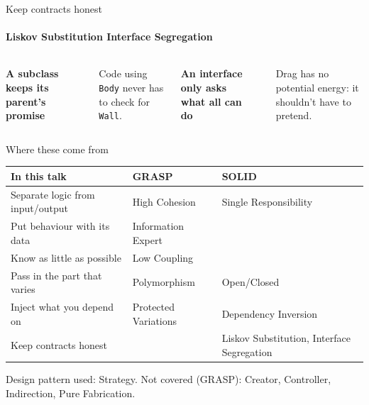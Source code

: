 \begin{frame}[fragile]{Keep contracts honest}
    \framesubtitle{Liskov Substitution \textperiodcentered{} Interface Segregation}

    \begin{columns}[T]
        \textbf{A subclass keeps its parent's promise}
        \inputminted{python}{code/design/contracts_subclass.py}
        \small Code using \texttt{Body} never has to check for \texttt{Wall}.

        \pause
        \textbf{An interface only asks what all can do}
        \inputminted{python}{code/design/contracts_interface.py}
        \small Drag has no potential energy: it shouldn't have to pretend.
    \end{columns}

\end{frame}



\begin{frame}{Where these come from}

    \centering\small
    \begin{tabular}{lll}
        \textbf{In this talk} & \textbf{GRASP} & \textbf{SOLID} \\ \hline
        Separate logic from input/output & High Cohesion & Single Responsibility \\
        Put behaviour with its data & Information Expert & \\
        Know as little as possible & Low Coupling & \\
        Pass in the part that varies & Polymorphism & Open/Closed \\
        Inject what you depend on & Protected Variations & Dependency Inversion \\
        Keep contracts honest & & Liskov Substitution, Interface Segregation \\
    \end{tabular}

    \vfill
    \raggedright
    \small\textcolor{talkdim}{Design pattern used: Strategy. Not covered (GRASP): Creator, Controller, Indirection, Pure Fabrication.}

\end{frame}
